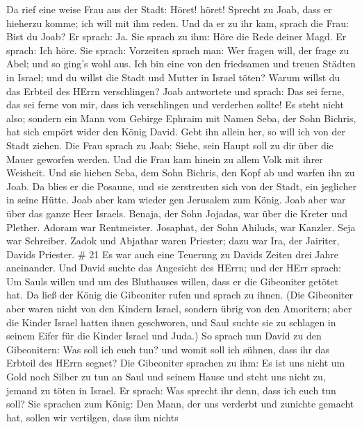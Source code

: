  Da rief eine weise Frau aus der Stadt: Höret! höret!
Sprecht zu Joab, dass er hieherzu komme; ich will mit ihm reden.
 Und da er zu ihr kam, sprach die Frau: Bist du Joab? Er
sprach: Ja. Sie sprach zu ihm: Höre die Rede deiner Magd. Er sprach: Ich
höre.  Sie sprach: Vorzeiten sprach man: Wer fragen will,
der frage zu Abel; und so ging's wohl aus.  Ich bin eine
von den friedsamen und treuen Städten in Israel; und du willst die Stadt
und Mutter in Israel töten? Warum willst du das Erbteil des HErrn
verschlingen?  Joab antwortete und sprach: Das sei ferne,
das sei ferne von mir, dass ich verschlingen und verderben sollte! Es
steht nicht also;  sondern ein Mann vom Gebirge Ephraim mit
Namen Seba, der Sohn Bichris, hat sich empört wider den König David.
Gebt ihn allein her, so will ich von der Stadt ziehen. Die Frau sprach
zu Joab: Siehe, sein Haupt soll zu dir über die Mauer geworfen werden.
 Und die Frau kam hinein zu allem Volk mit ihrer Weisheit.
Und sie hieben Seba, dem Sohn Bichris, den Kopf ab und warfen ihn zu
Joab. Da blies er die Posaune, und sie zerstreuten sich von der Stadt,
ein jeglicher in seine Hütte. Joab aber kam wieder gen Jerusalem zum
König.  Joab aber war über das ganze Heer Israels. Benaja,
der Sohn Jojadas, war über die Kreter und Plether.  Adoram
war Rentmeister. Josaphat, der Sohn Ahiluds, war Kanzler. 
Seja war Schreiber. Zadok und Abjathar waren Priester; 
dazu war Ira, der Jairiter, Davids Priester. \# 21  Es war
auch eine Teuerung zu Davids Zeiten drei Jahre aneinander. Und David
suchte das Angesicht des HErrn; und der HErr sprach: Um Sauls willen und
um des Bluthauses willen, dass er die Gibeoniter getötet hat.
 Da ließ der König die Gibeoniter rufen und sprach zu ihnen.
(Die Gibeoniter aber waren nicht von den Kindern Israel, sondern übrig
von den Amoritern; aber die Kinder Israel hatten ihnen geschworen, und
Saul suchte sie zu schlagen in seinem Eifer für die Kinder Israel und
Juda.)  So sprach nun David zu den Gibeonitern: Was soll ich
euch tun? und womit soll ich sühnen, dass ihr das Erbteil des HErrn
segnet?  Die Gibeoniter sprachen zu ihm: Es ist uns nicht um
Gold noch Silber zu tun an Saul und seinem Hause und steht uns nicht zu,
jemand zu töten in Israel. Er sprach: Was sprecht ihr denn, dass ich
euch tun soll?  Sie sprachen zum König: Den Mann, der uns
verderbt und zunichte gemacht hat, sollen wir vertilgen, dass ihm nichts
